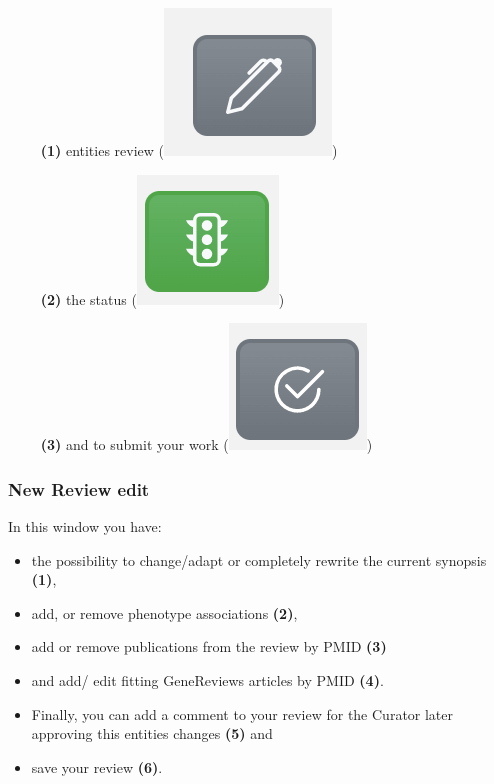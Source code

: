 \documentclass[
]{article}
\providecommand{\tightlist}{%
  \setlength{\itemsep}{0pt}\setlength{\parskip}{0pt}}
\begin{document}
~~~~ \textbf{(1)} entities review (\includegraphics{./static/img/edit_review_button.png})

~~~~ \textbf{(2)} the status (\includegraphics{./static/img/edit_status_button.png})

~~~~ \textbf{(3)} and to submit your work (\includegraphics{./static/img/submit_re-review_button.png})

\hypertarget{new-review-edit}{%
\subsubsection{New Review edit}\label{new-review-edit}}

In this window you have:

\begin{itemize}
\tightlist
\item
  the possibility to change/adapt or completely rewrite the current synopsis \textbf{(1)},
\item
  add, or remove phenotype associations \textbf{(2)},
\item
  add or remove publications from the review by PMID \textbf{(3)}
\item
  and add/ edit fitting GeneReviews articles by PMID \textbf{(4)}.
\item
  Finally, you can add a comment to your review for the Curator later approving this entities changes \textbf{(5)} and
\item
  save your review \textbf{(6)}.
\end{itemize}
\end{document}

